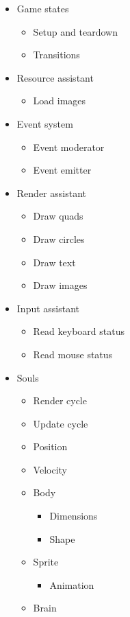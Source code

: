 \documentclass[a4paper]{article}
\begin{document}
\begin{itemize}
  \item Game states
  \begin{itemize}
    \item Setup and teardown
    \item Transitions
  \end{itemize}
  \item Resource assistant
  \begin{itemize}
    \item Load images
  \end{itemize}
  \item Event system
  \begin{itemize}
    \item Event moderator
    \item Event emitter
  \end{itemize}
  \item Render assistant
  \begin{itemize}
    \item Draw quads
    \item Draw circles
    \item Draw text
    \item Draw images
  \end{itemize}
  \item Input assistant
  \begin{itemize}
    \item Read keyboard status
    \item Read mouse status
  \end{itemize}
  \item Souls
  \begin{itemize}
    \item Render cycle
    \item Update cycle
    \item Position
    \item Velocity
    \item Body
    \begin{itemize}
      \item Dimensions
      \item Shape
    \end{itemize}
    \item Sprite
    \begin{itemize}
      \item Animation
    \end{itemize}
    \item Brain
  \end{itemize}

\end{itemize}
\end{document}
